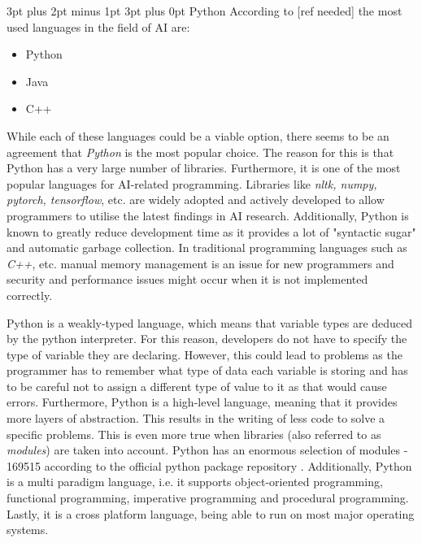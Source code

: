 \documentclass[12pt,a4paper]{article}
\makeatletter
\renewcommand\subsection{\@startsection {subsection}{1}{2mm} %
                                        {3pt plus 2pt minus 1pt} %
                                        {3pt plus 0pt} %
                                        {\normalfont\bfseries}}
\makeatother
\begin{document}
\subsection{Python}
According to [ref needed] the most used languages in the field of AI are:
\begin{itemize}
    \item Python
    \item Java
    \item C++
\end{itemize}

While each of these languages could be a viable option, there seems to be an agreement that \textit{Python} is the most popular choice.  The reason for this is that Python has a very large number of libraries. Furthermore, it is one of the most popular languages for AI-related programming. Libraries like \textit{nltk, numpy, pytorch, tensorflow}, etc. are widely adopted and actively developed to allow programmers to utilise the latest findings in AI research. Additionally, Python is known to greatly reduce development time as it provides a lot of "syntactic sugar" and automatic garbage collection. In traditional programming languages such as \textit{C++}, etc. manual memory management is an issue for new programmers and security and performance issues might occur when it is not implemented correctly. 

Python is a weakly-typed language, which means that variable types are deduced by the python interpreter. For this reason, developers do not have to specify the type of variable they are declaring. However, this could lead to problems as the programmer has to remember what type of data each variable is storing and has to be careful not to assign a different type of value to it as that would cause errors. Furthermore, Python is a high-level language, meaning that it provides more layers of abstraction. This results in the writing of less code to solve a specific problems. This is even more true when libraries (also referred to as \textit{modules}) are taken into account. Python has an enormous selection of modules - 169515 according to the official python package repository \cite{PyPI:online}. Additionally, Python is a multi paradigm language, i.e. it supports object-oriented programming, functional programming, imperative programming and procedural programming. Lastly, it is a cross platform language, being able to run on most major operating systems.
\end{document}
